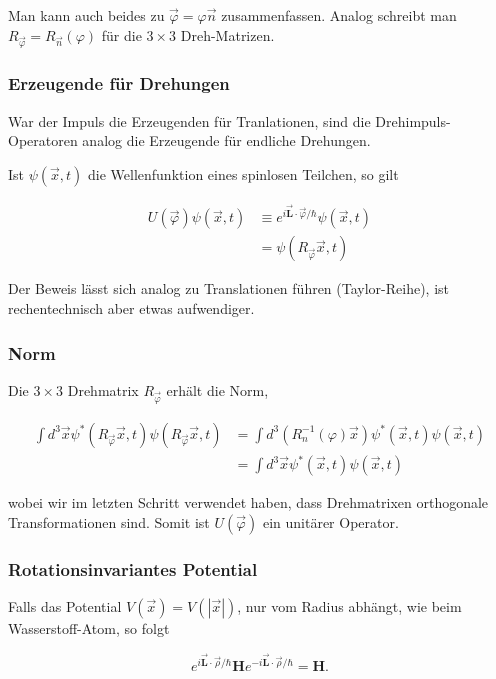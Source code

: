\documentclass[10pt, letterpaper]{article}
\begin{document}
Man kann auch beides zu $\vec{\varphi}=\varphi \vec{n}$ zusammenfassen. Analog schreibt man $R_{\vec{\varphi}}=R_{\vec{n}}(\varphi)$ für die $3 \times 3$ Dreh-Matrizen.

\subsubsection*{Erzeugende für Drehungen}
War der Impuls die Erzeugenden für Tranlationen, sind die Drehimpuls-Operatoren analog die Erzeugende für endliche Drehungen.

Ist $\psi(\vec{x}, t)$ die Wellenfunktion eines spinlosen Teilchen, so gilt

$$
\begin{aligned}
U(\vec{\varphi}) \psi(\vec{x}, t) & \equiv e^{i \overrightarrow{\mathbf{L}} \cdot \vec{\varphi} / \hbar} \psi(\vec{x}, t) \\
& =\psi\left(R_{\vec{\varphi}} \vec{x}, t\right)
\end{aligned}
$$

Der Beweis lässt sich analog zu Translationen führen (Taylor-Reihe), ist rechentechnisch aber etwas aufwendiger.

\subsubsection*{Norm}
Die $3 \times 3$ Drehmatrix $R_{\vec{\varphi}}$ erhält die Norm,

$$
\begin{aligned}
\int d^{3} \vec{x} \psi^{*}\left(R_{\vec{\varphi}} \vec{x}, t\right) \psi\left(R_{\vec{\varphi}} \vec{x}, t\right) & =\int d^{3}\left(R_{n}^{-1}(\varphi) \vec{x}\right) \psi^{*}(\vec{x}, t) \psi(\vec{x}, t) \\
& =\int d^{3} \vec{x} \psi^{*}(\vec{x}, t) \psi(\vec{x}, t)
\end{aligned}
$$

wobei wir im letzten Schritt verwendet haben, dass Drehmatrixen orthogonale Transformationen sind. Somit ist $U(\vec{\varphi})$ ein unitärer Operator.

\subsubsection*{Rotationsinvariantes Potential}
Falls das Potential $V(\vec{x})=V(|\vec{x}|)$, nur vom Radius abhängt, wie beim Wasserstoff-Atom, so folgt

$$
e^{i \overrightarrow{\mathbf{L}} \cdot \vec{\rho} / \hbar} \mathbf{H} e^{-i \overrightarrow{\mathbf{L}} \cdot \vec{\rho} / \hbar}=\mathbf{H} .
$$
\end{document}
